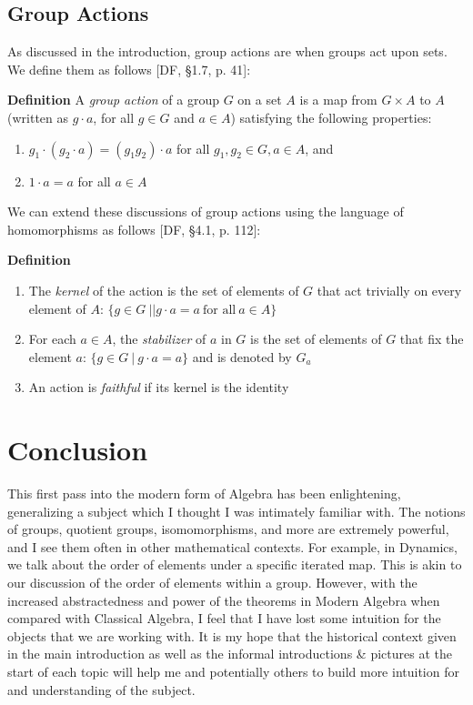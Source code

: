 \documentclass[11pt, reqno]{amsart}
\theoremstyle{plain}
\theoremstyle{definition}
\theoremstyle{example}
\begin{document}
\subsection{Group Actions}

\par
As discussed in the introduction, group actions are when groups act upon sets. We define them as follows [DF, \S 1.7, p. 41]:

\par
\textbf{Definition} A \textit{group action} of a group $G$ on a set $A$ is a map from $G \times A$ to $A$ (written as $g \cdot a$, for all $g \in G$ and $a \in A$) satisfying the following properties:
\begin{enumerate}
\item $g_1 \cdot (g_2 \cdot a) = (g_1g_2) \cdot a$ for all $g_1, g_2 \in G, a \in A$, and
\item $1 \cdot a = a$ for all $a \in A$
\end{enumerate}

We can extend these discussions of group actions using the language of homomorphisms as follows [DF, \S 4.1, p. 112]:

\par
\textbf{Definition}
\begin{enumerate}
\item The \textit{kernel} of the action is the set of elements of $G$ that act trivially on every element of $A$: $\{g \in G \ | | g \cdot a = a \ \text{for all} \ a \in A\}$
\item For each $a \in A$, the \textit{stabilizer} of $a$ in $G$ is the set of elements of $G$ that fix the element $a$: $\{g \in G \ | \ g \cdot a = a\}$ and is denoted by $G_a$
\item An action is \textit{faithful} if its kernel is the identity
\end{enumerate}

\section{Conclusion}

\par
This first pass into the modern form of Algebra has been enlightening, generalizing a subject which I thought I was intimately familiar with. The notions of groups, quotient groups, isomomorphisms, and more are extremely powerful, and I see them often in other mathematical contexts. For example, in Dynamics, we talk about the order of elements under a specific iterated map. This is akin to our discussion of the order of elements within a group. However, with the increased abstractedness and power of the theorems in Modern Algebra when compared with Classical Algebra, I feel that I have lost some intuition for the objects that we are working with. It is my hope that the historical context given in the main introduction as well as the informal introductions \& pictures at the start of each topic will help me and potentially others to build more intuition for and understanding of the subject.
\end{document}
